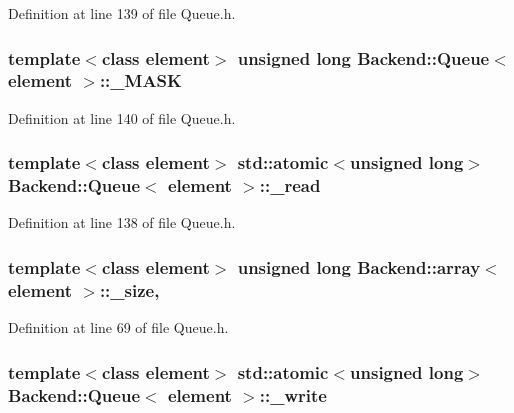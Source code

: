 Definition at line 139 of file Queue.\+h.

\hypertarget{class_backend_1_1_queue_ab665bcab528d6bad6c4faab1ae0fc1b4}{
\subsubsection[{\+\_\+\+M\+A\+S\+K}]{\setlength{\rightskip}{0pt plus 5cm}template$<$class element$>$ unsigned long {\bf Backend\+::\+Queue}$<$ element $>$\+::\+\_\+\+M\+A\+S\+K\hspace{0.3cm}{\ttfamily [protected]}}}\label{class_backend_1_1_queue_ab665bcab528d6bad6c4faab1ae0fc1b4}


Definition at line 140 of file Queue.\+h.

\hypertarget{class_backend_1_1_queue_a508eb8c4fedb73fc4abbf26353bdfd82}{
\subsubsection[{\+\_\+read}]{\setlength{\rightskip}{0pt plus 5cm}template$<$class element$>$ std\+::atomic$<$unsigned long$>$ {\bf Backend\+::\+Queue}$<$ element $>$\+::\+\_\+read\hspace{0.3cm}{\ttfamily [protected]}}}\label{class_backend_1_1_queue_a508eb8c4fedb73fc4abbf26353bdfd82}


Definition at line 138 of file Queue.\+h.

\hypertarget{class_backend_1_1array_ae51d64e87b42931946111c28b98e8a18}{
\subsubsection[{\+\_\+size}]{\setlength{\rightskip}{0pt plus 5cm}template$<$class element$>$ unsigned long {\bf Backend\+::array}$<$ element $>$\+::\+\_\+size\hspace{0.3cm}{\ttfamily [protected]}, {\ttfamily [inherited]}}}\label{class_backend_1_1array_ae51d64e87b42931946111c28b98e8a18}


Definition at line 69 of file Queue.\+h.

\hypertarget{class_backend_1_1_queue_ab3d5c4738092cf356b36c56f6ab61554}{
\subsubsection[{\+\_\+write}]{\setlength{\rightskip}{0pt plus 5cm}template$<$class element$>$ std\+::atomic$<$unsigned long$>$ {\bf Backend\+::\+Queue}$<$ element $>$\+::\+\_\+write\hspace{0.3cm}{\ttfamily [protected]}}}\label{class_backend_1_1_queue_ab3d5c4738092cf356b36c56f6ab61554}


